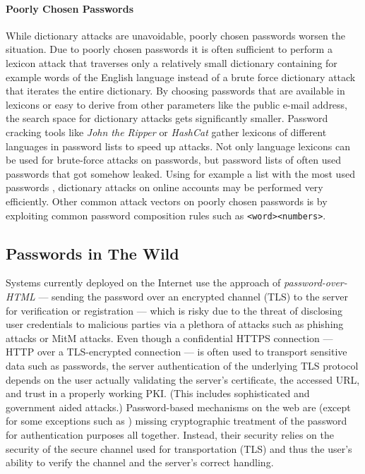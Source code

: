 \paragraph{Poorly Chosen Passwords}
While dictionary attacks are unavoidable, poorly chosen passwords worsen the situation.
Due to poorly chosen passwords it is often sufficient to perform a lexicon attack that traverses only a relatively small dictionary containing for example words of the English language instead of a brute force dictionary attack that iterates the entire dictionary.
By choosing passwords that are available in lexicons or easy to derive from other parameters like the public e-mail address, the search space for dictionary attacks gets significantly smaller.
Password cracking tools like \emph{John the Ripper} \cite{JohnTheRipper} or \emph{HashCat} \cite{hashcat} gather lexicons of different languages in password lists \cite{JohnTheRipperWordlist} to speed up attacks.
Not only language lexicons can be used for brute-force attacks on passwords, but password lists of often used passwords that got somehow leaked.
Using for example a list with the most used passwords \cite{XatoPwds,XatoPwds2,skullSecurity}, dictionary attacks on online accounts may be performed very efficiently.
Other common attack vectors on poorly chosen passwords is by exploiting common password composition rules such as \verb+<word><numbers>+.


\subsection{Passwords in The Wild}
Systems currently deployed on the Internet use the approach of \emph{password-over-\acs{HTML}} --- sending the password over an encrypted channel (\ac{TLS}) to the server for verification or registration --- which is risky due to the threat of disclosing user credentials to malicious parties via a plethora of attacks such as phishing attacks or \ac{MitM} attacks.
Even though a confidential \ac{HTTPS} connection --- \ac{HTTP} over a \ac{TLS}-encrypted connection --- is often used to transport sensitive data such as passwords, the server authentication of the underlying \ac{TLS} protocol depends on the user actually validating the server's certificate, the accessed \ac{URL}, and trust in a properly working \ac{PKI}.
(This includes sophisticated and government aided attacks.)
Password-based mechanisms on the web are (except for some exceptions such as \cite{FirefoxSync}) missing cryptographic treatment of the password for authentication purposes all together.
Instead, their security relies on the security of the secure channel used for transportation (\ac{TLS}) and thus the user's ability to verify the channel and the server's correct handling.

